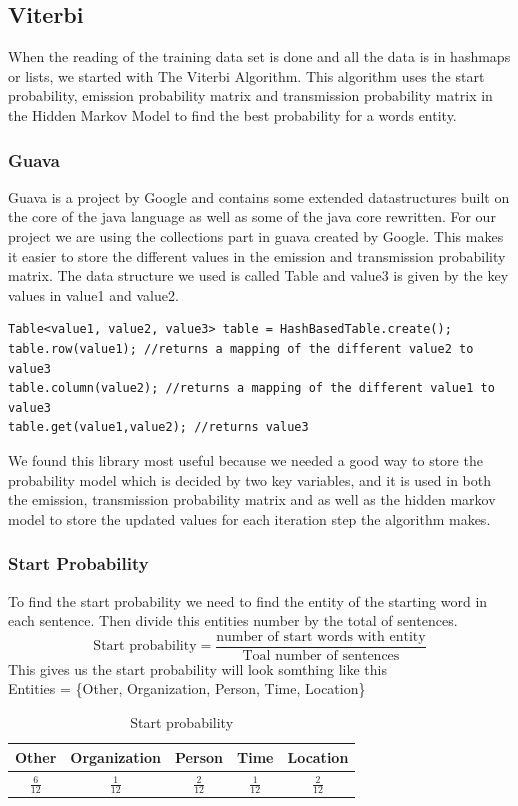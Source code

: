 \documentclass{article}
\begin{document}
\subsection{Viterbi}
When the reading of the training data set is done and all the data is in hashmaps or lists, we started with The Viterbi Algorithm. This algorithm uses the start probability, emission probability matrix and transmission probability matrix in the Hidden Markov Model to find the best probability for a words entity.

\subsubsection{Guava}
Guava is a project by Google and contains some extended datastructures built on the core of the java language as well as some of the java core rewritten. For our project we are using the collections part in guava created by Google. This makes it easier to store the different values in the emission and transmission probability matrix. The data structure we used is called Table and value3 is given by the key values in value1 and value2.
\begin{verbatim}
Table<value1, value2, value3> table = HashBasedTable.create();
table.row(value1); //returns a mapping of the different value2 to value3
table.column(value2); //returns a mapping of the different value1 to value3
table.get(value1,value2); //returns value3
\end{verbatim}
We found this library most useful because we needed a good way to store the probability model which is decided by two key variables, and it is used in both the emission, transmission probability matrix and as well as the hidden markov model to store the updated values for each iteration step the algorithm makes.

\subsubsection{Start Probability}
To find the start probability we need to find the entity of the starting word in each sentence. Then divide this entities number by the total of sentences.\\
\begin{equation}
\text{Start probability} = \frac{\text{number of start words with entity}}{\text{Toal number of sentences}}
\end{equation}
This gives us the start probability will look somthing like this\\
Entities = \{Other, Organization, Person, Time, Location\}
\begin{table}[here]
\centering
\begin{tabular}{|c|c|c|c|c|}
\hline
Other & Organization & Person & Time & Location\\
\hline
$\frac{6}{12}$ & $\frac{1}{12}$ & $\frac{2}{12}$ & $\frac{1}{12}$ & $\frac{2}{12}$\\
\hline
\end{tabular}
\caption{Start probability}
\label{tab:startProbability}
\end{table}
\clearpage
\end{document}
